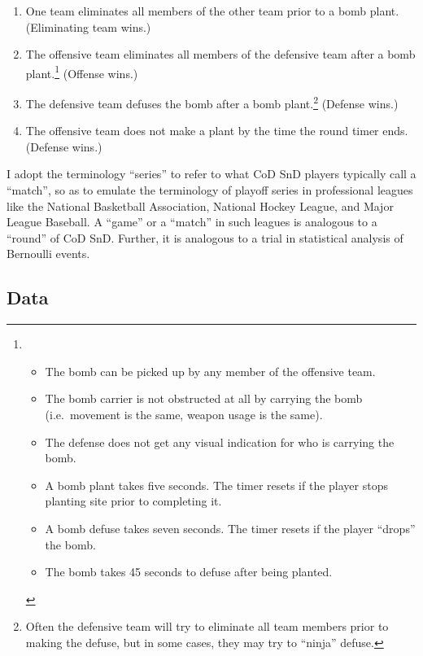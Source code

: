 \documentclass{article}
\providecommand{\tightlist}{%
  \setlength{\itemsep}{0pt}\setlength{\parskip}{0pt}}
\begin{document}
\begin{enumerate}
\def\labelenumi{\arabic{enumi}.}
\tightlist
\item
  One team eliminates all members of the other team prior to a bomb
  plant. (Eliminating team wins.)
\item
  The offensive team eliminates all members of the defensive team after
  a bomb plant.\footnote{\begin{itemize}
    \tightlist
    \item
      The bomb can be picked up by any member of the offensive team.
    \item
      The bomb carrier is not obstructed at all by carrying the bomb
      (i.e.~movement is the same, weapon usage is the same).
    \item
      The defense does not get any visual indication for who is carrying
      the bomb.
    \item
      A bomb plant takes five seconds. The timer resets if the player
      stops planting site prior to completing it.
    \item
      A bomb defuse takes seven seconds. The timer resets if the player
      ``drops'' the bomb.
    \item
      The bomb takes 45 seconds to defuse after being planted.
    \end{itemize}} (Offense wins.)
\item
  The defensive team defuses the bomb after a bomb plant.\footnote{Often
    the defensive team will try to eliminate all team members prior to
    making the defuse, but in some cases, they may try to ``ninja''
    defuse.} (Defense wins.)
\item
  The offensive team does not make a plant by the time the round timer
  ends. (Defense wins.)
\end{enumerate}

I adopt the terminology ``series'' to refer to what CoD SnD players
typically call a ``match'', so as to emulate the terminology of playoff
series in professional leagues like the National Basketball Association,
National Hockey League, and Major League Baseball. A ``game'' or a
``match'' in such leagues is analogous to a ``round'' of CoD SnD.
Further, it is analogous to a trial in statistical analysis of Bernoulli
events.

\hypertarget{data}{%
\subsection{Data}\label{data}}
\end{document}
